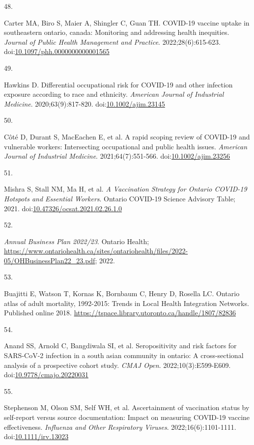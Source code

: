 \documentclass[
  letterpaper,
  DIV=11,
  numbers=noendperiod]{scrartcl}
\newlength{\cslhangindent}
\newlength{\csllabelwidth}
\newlength{\cslentryspacingunit} %
\newenvironment{CSLReferences}[2] %
 {%
  \setlength{\parindent}{0pt}
  \ifodd #1
  \let\oldpar\par
  \def\par{\hangindent=\cslhangindent\oldpar}
  \fi
  \setlength{\parskip}{#2\cslentryspacingunit}
 }%
 {}
\newcommand{\CSLLeftMargin}[1]{\parbox[t]{\csllabelwidth}{#1}}
\newcommand{\CSLRightInline}[1]{\parbox[t]{\linewidth - \csllabelwidth}{#1}\break}
\begin{document}
\begin{CSLReferences}{0}{0}
\leavevmode{}%
\CSLLeftMargin{48. }%
\CSLRightInline{Carter MA, Biro S, Maier A, Shingler C, Guan TH.
{COVID}-19 vaccine uptake in southeastern ontario, canada: Monitoring
and addressing health inequities. \emph{Journal of Public Health
Management and Practice}. 2022;28(6):615-623.
doi:\href{https://doi.org/10.1097/phh.0000000000001565}{10.1097/phh.0000000000001565}}

\leavevmode{}%
\CSLLeftMargin{49. }%
\CSLRightInline{Hawkins D. Differential occupational risk for {COVID}-19
and other infection exposure according to race and ethnicity.
\emph{American Journal of Industrial Medicine}. 2020;63(9):817-820.
doi:\href{https://doi.org/10.1002/ajim.23145}{10.1002/ajim.23145}}

\leavevmode{}%
\CSLLeftMargin{50. }%
\CSLRightInline{Côté D, Durant S, MacEachen E, et al. A rapid scoping
review of {COVID}-19 and vulnerable workers: Intersecting occupational
and public health issues. \emph{American Journal of Industrial
Medicine}. 2021;64(7):551-566.
doi:\href{https://doi.org/10.1002/ajim.23256}{10.1002/ajim.23256}}

\leavevmode{}%
\CSLLeftMargin{51. }%
\CSLRightInline{Mishra S, Stall NM, Ma H, et al. \emph{A Vaccination
Strategy for Ontario {COVID}-19 Hotspots and Essential Workers}. Ontario
{COVID}-19 Science Advisory Table; 2021.
doi:\href{https://doi.org/10.47326/ocsat.2021.02.26.1.0}{10.47326/ocsat.2021.02.26.1.0}}

\leavevmode{}%
\CSLLeftMargin{52. }%
\CSLRightInline{\emph{{A}nnual {B}usiness {P}lan 2022/23}. Ontario
Health;
\url{https://www.ontariohealth.ca/sites/ontariohealth/files/2022-05/OHBusinessPlan22_23.pdf};
2022.}

\leavevmode{}%
\CSLLeftMargin{53. }%
\CSLRightInline{Buajitti E, Watson T, Kornas K, Bornbaum C, Henry D,
Rosella LC. Ontario atlas of adult mortality, 1992-2015: Trends in
{L}ocal {H}ealth {I}ntegration {N}etworks. Published online 2018.
\url{https://tspace.library.utoronto.ca/handle/1807/82836}}

\leavevmode{}%
\CSLLeftMargin{54. }%
\CSLRightInline{Anand SS, Arnold C, Bangdiwala SI, et al. Seropositivity
and risk factors for {SARS}-{CoV}-2 infection in a south asian community
in ontario: A cross-sectional analysis of a prospective cohort study.
\emph{{CMAJ} Open}. 2022;10(3):E599-E609.
doi:\href{https://doi.org/10.9778/cmajo.20220031}{10.9778/cmajo.20220031}}

\leavevmode{}%
\CSLLeftMargin{55. }%
\CSLRightInline{Stephenson M, Olson SM, Self WH, et al. Ascertainment of
vaccination status by self-report versus source documentation: Impact on
measuring {COVID}-19 vaccine effectiveness. \emph{Influenza and Other
Respiratory Viruses}. 2022;16(6):1101-1111.
doi:\href{https://doi.org/10.1111/irv.13023}{10.1111/irv.13023}}

\end{CSLReferences}
\end{document}
